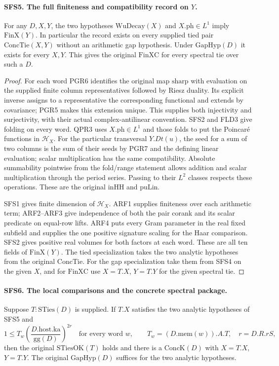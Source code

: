 \paragraph{SFS5. The full finiteness and compatibility record on $Y$.}
\label{claim:SFS5}
For any $D,X,Y$, the two hypotheses
$\mathrm{WuDecay}(X)$ and $X.\mathrm{ph}\in L^1$ imply
$\mathrm{FinX}(Y)$. In particular the record exists on every
supplied tied pair $\mathrm{ConcTie}(X,Y)$ without an arithmetic
gap hypothesis. Under $\mathrm{GapHyp}(D)$ it exists for every
$X,Y$. This gives the original $\mathrm{FinXC}$ for every
spectral tie over such a $D$.

\begin{proof}
For each word PGR6 identifies the original map
$\mathrm{sharp}$ with evaluation on the supplied finite column
representatives followed by Riesz duality. Its explicit inverse
assigns to a representative the corresponding functional and
extends by covariance; PGR5 makes this extension unique.
This supplies both injectivity and surjectivity, with their actual
complex-antilinear convention. SFS2 and FLD3 give folding on
every word. QPR3 uses $X.\mathrm{ph}\in L^1$ and those folds to
put the Poincar\'e functions in $\mathcal H_X$. For the particular
transversal $Y.Dt(u)$, the seed for a sum of two columns is the
sum of their seeds by PGR7 and the defining linear evaluation;
scalar multiplication has the same compatibility. Absolute
summability pointwise from the fold/range statement allows
addition and scalar multiplication through the period series.
Passing to their $L^2$ classes respects these operations. These
are the original $\mathrm{inHH}$ and $\mathrm{puLin}$.

SFS1 gives finite dimension of $\mathcal H_X$. ARF1 supplies
finiteness over each arithmetic term; ARF2--ARF3 give independence
of both the pair corank and its scalar predicate on equal-row
lifts. ARF4 puts every Gram parameter in the real fixed subfield
and supplies the one positive signature scaling for the Haar
comparison. SFS2 gives positive real volumes for both factors
at each word. These are all ten fields of $\mathrm{FinX}(Y)$.
The tied specialization takes the two analytic hypotheses from
the original $\mathrm{ConcTie}$. For the gap specialization
take them from SFS4 on the given $X$, and for
$\mathrm{FinXC}$ use $X=T.X$, $Y=T.Y$ for the given spectral tie.
\end{proof}

\paragraph{SFS6. The local comparisons and the concrete spectral package.}
\label{claim:SFS6}
Suppose $T:\mathrm{STies}(D)$ is supplied. If $T.X$ satisfies
the two analytic hypotheses of SFS5 and
\[
   1\le T_w\left(\frac{D.\mathrm{host}.\mathrm{ka}}
                                {\mathrm{gg}(D)}\right)^{2r}
            \quad\text{for every word }w,\qquad
            T_w=(D.\mathrm{mem}(w)).A.T,\quad r=D.R.rS ,
\tag{SFS.1}
\]
then the original $\mathrm{STiesOK}(T)$ holds and there is a
$\mathrm{ConcK}(D)$ with $X=T.X$, $Y=T.Y$. The original
$\mathrm{GapHyp}(D)$ suffices for the two analytic hypotheses.

